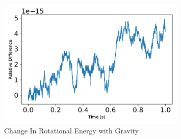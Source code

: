 \begin{figure}[htbp]\centerline{\includegraphics[width=0.8\textwidth]{AutoTeX/ChangeInRotationalEnergySystem}}\caption{Change In Rotational Energy with Gravity}\label{fig:ChangeInRotationalEnergySystem}\end{figure}